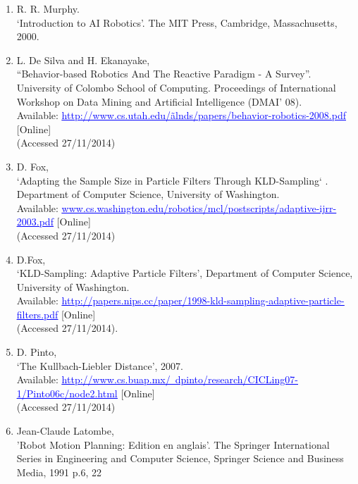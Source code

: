 \documentclass{article}
\begin{document}
\begin{enumerate}
\item R. R. Murphy.
\\‘Introduction to AI Robotics’. The MIT Press, Cambridge, Massachusetts, 2000.

\item L. De Silva and H. Ekanayake,
\\“Behavior-based Robotics And The Reactive Paradigm - A Survey”. University of Colombo School of Computing. Proceedings of International Workshop on Data Mining and Artificial Intelligence (DMAI’ 08).
\\Available: \href{http://www.cs.utah.edu/~alnds/papers/behavior_robotics_2008.pdf}{\textcolor{blue}{\uline{http://www.cs.utah.edu/\~alnds/papers/behavior-robotics-2008.pdf}}} [Online]
\\(Accessed 27/11/2014)

\item D. Fox,
\\‘Adapting the Sample Size in Particle Filters Through KLD-Sampling‘ . Department of Computer Science, University of Washington.
\\Available: \href{http://www.cs.washington.edu/robotics/mcl/postscripts/adaptive-ijrr-2003.pdf}{\textcolor{blue}{\uline{www.cs.washington.edu/robotics/mcl/postscripts/adaptive-ijrr-2003.pdf}}} [Online]
\\(Accessed 27/11/2014)

\item D.Fox,
\\‘KLD-Sampling: Adaptive Particle Filters’, Department of Computer Science, University of Washington.
\\Available: \href{http://papers.nips.cc/paper/1998-kld-sampling-adaptive-particle-filters.pdf}{\textcolor{blue}{\uline{http://papers.nips.cc/paper/1998-kld-sampling-adaptive-particle-filters.pdf}}} [Online]
\\(Accessed 27/11/2014).

\item D. Pinto,
\\‘The Kullbach-Liebler Distance’, 2007.
\\Available: \href{http://www.cs.buap.mx/~dpinto/research/CICLing07_1/Pinto06c/node2.html}{\textcolor{blue}{\uline{http://www.cs.buap.mx/~dpinto/research/CICLing07-1/Pinto06c/node2.html}}} [Online]
\\(Accessed 27/11/2014)

\item Jean-Claude Latombe,
\\'Robot Motion Planning: Edition en anglais'. The Springer International Series in Engineering and Computer Science, Springer Science and Business Media, 1991 p.6, 22


\end{enumerate}
\end{document}
